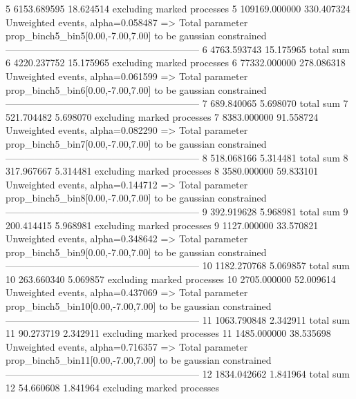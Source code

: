 5          6153.689595     18.624514       excluding marked processes    
5          109169.000000   330.407324      Unweighted events, alpha=0.058487
  => Total parameter prop_binch5_bin5[0.00,-7.00,7.00] to be gaussian constrained
------------------------------------------------------------
6          4763.593743     15.175965       total sum                     
6          4220.237752     15.175965       excluding marked processes    
6          77332.000000    278.086318      Unweighted events, alpha=0.061599
  => Total parameter prop_binch5_bin6[0.00,-7.00,7.00] to be gaussian constrained
------------------------------------------------------------
7          689.840065      5.698070        total sum                     
7          521.704482      5.698070        excluding marked processes    
7          8383.000000     91.558724       Unweighted events, alpha=0.082290
  => Total parameter prop_binch5_bin7[0.00,-7.00,7.00] to be gaussian constrained
------------------------------------------------------------
8          518.068166      5.314481        total sum                     
8          317.967667      5.314481        excluding marked processes    
8          3580.000000     59.833101       Unweighted events, alpha=0.144712
  => Total parameter prop_binch5_bin8[0.00,-7.00,7.00] to be gaussian constrained
------------------------------------------------------------
9          392.919628      5.968981        total sum                     
9          200.414415      5.968981        excluding marked processes    
9          1127.000000     33.570821       Unweighted events, alpha=0.348642
  => Total parameter prop_binch5_bin9[0.00,-7.00,7.00] to be gaussian constrained
------------------------------------------------------------
10         1182.270768     5.069857        total sum                     
10         263.660340      5.069857        excluding marked processes    
10         2705.000000     52.009614       Unweighted events, alpha=0.437069
  => Total parameter prop_binch5_bin10[0.00,-7.00,7.00] to be gaussian constrained
------------------------------------------------------------
11         1063.790848     2.342911        total sum                     
11         90.273719       2.342911        excluding marked processes    
11         1485.000000     38.535698       Unweighted events, alpha=0.716357
  => Total parameter prop_binch5_bin11[0.00,-7.00,7.00] to be gaussian constrained
------------------------------------------------------------
12         1834.042662     1.841964        total sum                     
12         54.660608       1.841964        excluding marked processes    
